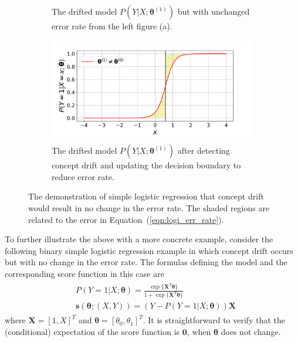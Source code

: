 \documentclass[twoside,11pt]{article}
\begin{document}
\begin{figure}[!htbp]
\begin{subfigure}[t]{0.4\linewidth}
         \captionsetup{width=.95\linewidth}
         \caption{The drifted model $P(Y|{X};\bm{\theta}^{(1)})$ but with unchanged error rate from the left figure (a).}
         \label{fig:logi_err_rate_unch_b}
  \end{subfigure}
  \begin{subfigure}[t]{0.4\linewidth}
         \centering
	 \includegraphics[width=\textwidth, trim=.2in .2in .7in .45in, clip]{../figures/v14/demons_fig/2D_logi_cd_updated.png}
         \captionsetup{width=.95\linewidth}
         \caption{The drifted model $P(Y|{X};\bm{\theta}^{(1)})$ after detecting concept drift and updating the decision boundary to reduce error rate.}
         \label{fig:logi_err_rate_unch_d}
  \end{subfigure}
  \caption{The demonstration of simple logistic regression that concept drift would result in no change in the error rate. The shaded regions are related to the error in Equation~(\ref{eqn:logi_err_rate}).}
  \label{fig:logi_err_rate_unch}
\end{figure}

To further illustrate the above with a more concrete example, consider the following binary simple logistic regression example in which concept drift occurs but with no change in the error rate. The formulas defining the model and the corresponding score function in this case are
\begin{align}
\begin{aligned}
&P(Y=1|{X};\bm{\theta}) = \frac{\exp\{\bm {X}^{T} \bm {\theta}\}}{1+\exp\{\bm {X}^{T} \bm {\theta}\}} \\
&\bm {s}(\bm { \theta} ; ( {X}, Y)) = (Y-P(Y=1|{X};\bm{\theta}))\bm {X}
\end{aligned}
\label{eqn:logi_mod_score}
\end{align}
where $\bm{X} = [1, X]^T$ and $\bm{\theta}=[\theta_0, \theta_1]^T$. It is straightforward to verify that the (conditional) expectation of the score function is $\bm {0}$, when $\bm{\theta}$ does not change.
\end{document}
